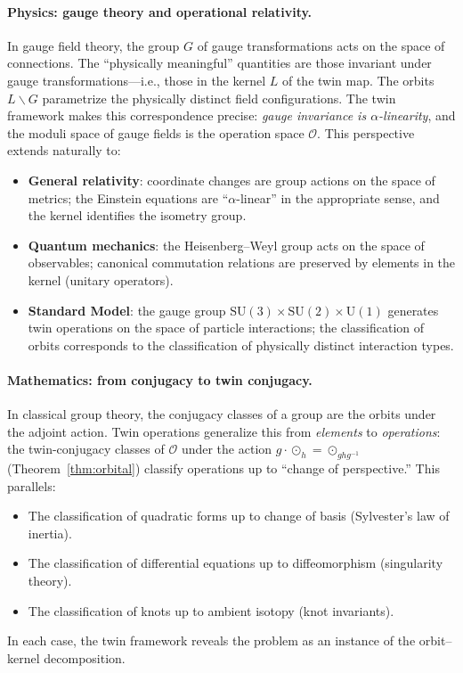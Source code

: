 \documentclass[11pt,a4paper,openany]{book}
\theoremstyle{plain}
\theoremstyle{definition}
\newcommand{\twing}[1]{\odot_{#1}}
\newcommand{\opspace}{\mathcal{O}}
\newcommand{\lingroup}{L}
\newcommand{\groupG}{G}
\begin{document}
\paragraph{Physics: gauge theory and operational relativity.} In gauge field theory, the group $\groupG$ of gauge transformations acts on the space of connections. The ``physically meaningful'' quantities are those invariant under gauge transformations---i.e., those in the kernel $\lingroup$ of the twin map. The orbits $\lingroup\backslash\groupG$ parametrize the physically distinct field configurations. The twin framework makes this correspondence precise: \emph{gauge invariance is $\alpha$-linearity}, and the moduli space of gauge fields is the operation space $\opspace$. This perspective extends naturally to:
\begin{itemize}
\item \textbf{General relativity}: coordinate changes are group actions on the space of metrics; the Einstein equations are ``$\alpha$-linear'' in the appropriate sense, and the kernel identifies the isometry group.
\item \textbf{Quantum mechanics}: the Heisenberg--Weyl group acts on the space of observables; canonical commutation relations are preserved by elements in the kernel (unitary operators).
\item \textbf{Standard Model}: the gauge group $\mathrm{SU}(3) \times \mathrm{SU}(2) \times \mathrm{U}(1)$ generates twin operations on the space of particle interactions; the classification of orbits corresponds to the classification of physically distinct interaction types.
\end{itemize}

\paragraph{Mathematics: from conjugacy to twin conjugacy.} In classical group theory, the conjugacy classes of a group are the orbits under the adjoint action. Twin operations generalize this from \emph{elements} to \emph{operations}: the twin-conjugacy classes of $\opspace$ under the action $g \cdot \twing{h} = \twing{ghg^{-1}}$ (Theorem~\ref{thm:orbital}) classify operations up to ``change of perspective.'' This parallels:
\begin{itemize}
\item The classification of quadratic forms up to change of basis (Sylvester's law of inertia).
\item The classification of differential equations up to diffeomorphism (singularity theory).
\item The classification of knots up to ambient isotopy (knot invariants).
\end{itemize}
In each case, the twin framework reveals the problem as an instance of the orbit--kernel decomposition.
\end{document}
